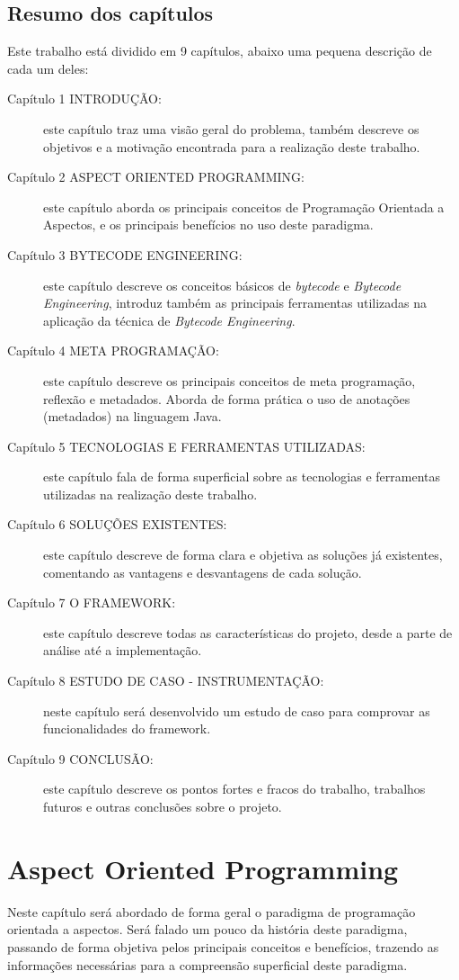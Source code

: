 \documentclass[tc,oneside]{iiufrgs}
\begin{document}
\section{Resumo dos capítulos}

Este trabalho está dividido em 9 capítulos, abaixo uma pequena descrição de cada um deles:

\begin{description}
\item [Capítulo 1 INTRODUÇÃO:] este capítulo traz uma visão geral do problema, também descreve os objetivos e a motivação encontrada para a realização deste trabalho.
\item [Capítulo 2 ASPECT ORIENTED PROGRAMMING:] este capítulo aborda os principais conceitos de Programação Orientada a Aspectos, e os principais benefícios no uso deste paradigma.
\item [Capítulo 3 BYTECODE ENGINEERING:] este capítulo descreve os conceitos básicos de \textit{bytecode} e \textit{Bytecode Engineering}, introduz também as principais ferramentas utilizadas na aplicação da técnica de \textit{Bytecode Engineering}.
\item [Capítulo 4 META PROGRAMAÇÃO:] este capítulo descreve os principais conceitos de meta programação, reflexão e metadados. Aborda de forma prática o uso de anotações (metadados) na linguagem Java.
\item [Capítulo 5 TECNOLOGIAS E FERRAMENTAS UTILIZADAS:] este capítulo fala de forma superficial sobre as tecnologias e ferramentas utilizadas na realização deste trabalho.
\item [Capítulo 6 SOLUÇÕES EXISTENTES:] este capítulo descreve de forma clara e objetiva as soluções já existentes, comentando as vantagens e desvantagens de cada solução.
\item [Capítulo 7 O FRAMEWORK:] este capítulo descreve todas as características do projeto, desde a parte de análise até a implementação.
\item [Capítulo 8 ESTUDO DE CASO - INSTRUMENTAÇÃO:] neste capítulo será desenvolvido um estudo de caso para comprovar as funcionalidades do framework.
\item [Capítulo 9 CONCLUSÃO:] este capítulo descreve os pontos fortes e fracos do trabalho, trabalhos futuros e outras conclusões sobre o projeto. 
\end{description}
 
\chapter{Aspect Oriented Programming}
Neste capítulo será abordado de forma geral o paradigma de programação orientada a aspectos. Será falado um pouco da história deste paradigma, passando de forma objetiva pelos principais conceitos e benefícios, trazendo as informações necessárias para a compreensão superficial deste paradigma.
\end{document}
